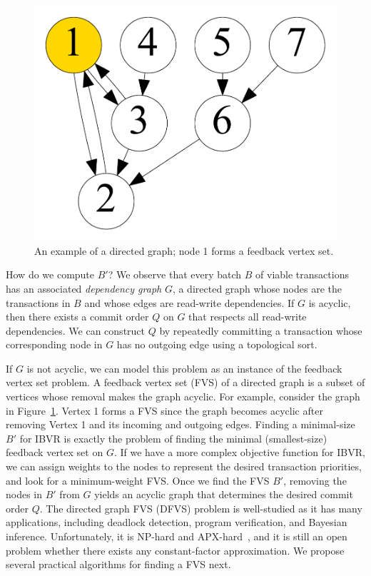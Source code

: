 \begin{figure}[t]
	\centering
	\includegraphics[width=0.4\columnwidth]{./alg_fig/fvs-eg}
	\caption{An example of a directed graph; node 1 forms a feedback vertex set.}
	\label{fig:fvs}
\end{figure}

How do we compute $B'$? We observe that every batch $B$ of viable transactions 
has an associated \emph{dependency graph} $G$, a directed graph whose nodes are the transactions in $B$ and whose edges are read-write dependencies.
If $G$ is acyclic, then there exists a commit order $Q$ on $G$ that respects all read-write dependencies. We can construct $Q$ by repeatedly committing a transaction whose corresponding node in $G$ has no outgoing edge using a topological sort. 

If $G$ is not acyclic, we can model this problem as an instance of the feedback vertex set problem. 
A feedback vertex set (FVS) of a directed graph is a subset of vertices whose removal makes the graph acyclic. For example, consider the graph in Figure~\ref{fig:fvs}. Vertex 1 forms a FVS since the graph becomes acyclic after removing Vertex 1 and its incoming and outgoing edges. Finding a minimal-size $B'$ for IBVR is exactly the problem of finding the minimal (smallest-size) feedback vertex set on $G$. If we have a more complex objective function for IBVR, we can assign weights to the nodes to represent the desired transaction priorities, and look for a minimum-weight FVS. 
Once we find the FVS $B'$, removing the nodes in $B'$ from $G$ yields an acyclic graph that determines the desired commit order $Q$.
The directed graph FVS (DFVS) problem is well-studied as it has many applications, including deadlock detection, program verification, and Bayesian inference. Unfortunately, it is NP-hard and APX-hard~\cite{kann1992approximability, karp1972reducibility}, and it is still an open problem whether there exists any constant-factor approximation.
We propose several practical algorithms for finding a FVS next.


